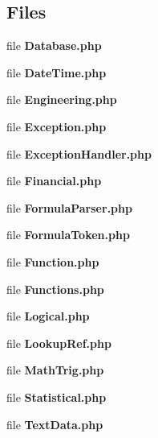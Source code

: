 \subsection*{Files}
\begin{DoxyCompactItemize}
\item 
file {\bfseries Database.\+php}
\item 
file {\bfseries Date\+Time.\+php}
\item 
file {\bfseries Engineering.\+php}
\item 
file {\bfseries Exception.\+php}
\item 
file {\bfseries Exception\+Handler.\+php}
\item 
file {\bfseries Financial.\+php}
\item 
file {\bfseries Formula\+Parser.\+php}
\item 
file {\bfseries Formula\+Token.\+php}
\item 
file {\bfseries Function.\+php}
\item 
file {\bfseries Functions.\+php}
\item 
file {\bfseries Logical.\+php}
\item 
file {\bfseries Lookup\+Ref.\+php}
\item 
file {\bfseries Math\+Trig.\+php}
\item 
file {\bfseries Statistical.\+php}
\item 
file {\bfseries Text\+Data.\+php}
\end{DoxyCompactItemize}
